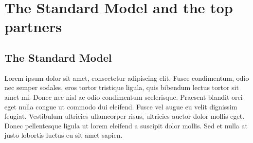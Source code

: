 \chapter{The Standard Model and the top partners}\label{ch:top_partner}
\section{The Standard Model}

Lorem ipsum dolor sit amet, consectetur adipiscing elit. Fusce condimentum, odio nec semper sodales, eros tortor tristique ligula, quis bibendum lectus tortor sit amet mi. Donec nec nisl ac odio condimentum scelerisque. Praesent blandit orci eget nulla congue ut commodo dui eleifend. Fusce vel augue eu velit dignissim feugiat. Vestibulum ultricies ullamcorper risus, ultricies auctor dolor mollis eget. Donec pellentesque ligula ut lorem eleifend a suscipit dolor mollis. Sed et nulla at justo lobortis luctus eu sit amet sapien.
